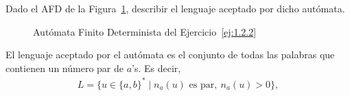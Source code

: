 \begin{ejercicio} \label{ej:1.2.2}
    Dado el AFD de la Figura~\ref{fig:ej:1.2.2}, describir el lenguaje aceptado por dicho autómata.
    \begin{figure}
        \centering
        \caption{Autómata Finito Determinista del Ejercicio~\ref{ej:1.2.2}}
        \label{fig:ej:1.2.2}
    \end{figure}

    El lenguaje aceptado por el autómata es el conjunto de todas las palabras que contienen
    un número par de $a$'s. Es decir,
    \begin{align*}
        L = \{u \in \{a, b\}^* \mid n_a(u) \text{\ es par},~n_a(u)>0\},
    \end{align*}
\end{ejercicio}

